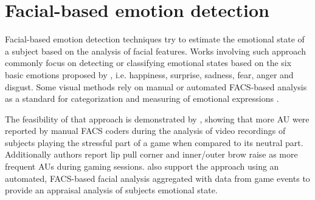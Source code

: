 

\section{Facial-based emotion detection}
\label{ch:literature-face-emotion-detection}

Facial-based emotion detection techniques try to estimate the emotional state of a subject based on the analysis of facial features. Works involving such approach commonly focus on detecting or classifying emotional states based on the six basic emotions proposed by \textcite{ekman1971constants}, i.e. happiness, surprise, sadness, fear, anger and disgust. Some visual methods rely on manual or automated FACS-based analysis as a standard for categorization and measuring of emotional expressions \parencite{bartlett1999measuring}.

The feasibility of that approach is demonstrated by \textcite{kaiser1994multi}, showing that more AU were reported by manual FACS coders during the analysis of video recordings of subjects playing the stressful part of a game when compared to its neutral part. Additionally authors report lip pull corner and inner/outer brow raise as more frequent AUs during gaming sessions. \textcite{wehrle2000emotion} also support the approach using an automated, FACS-based facial analysis aggregated with data from game events to provide an appraisal analysis of subjects emotional state.

